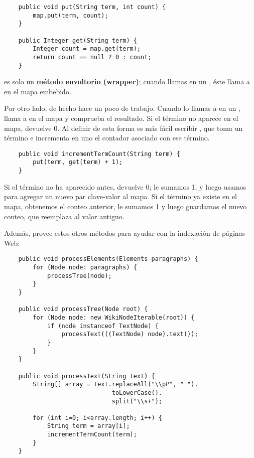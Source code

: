 \documentclass[12pt]{book}
\theoremstyle{exercise}
\begin{document}
\begin{verbatim}
    public void put(String term, int count) {
        map.put(term, count);
    }

    public Integer get(String term) {
        Integer count = map.get(term);
        return count == null ? 0 : count;
    }
\end{verbatim}

 es solo un \textbf{método envoltorio (wrapper)}; cuando llamas
 en un , éste llama a  en el
mapa embebido.


Por otro lado,  de hecho hace un poco de trabajo. Cuando lo
llamas a  en un , llama a  en el
mapa y comprueba el resultado. Si el término no aparece en el
mapa, devuelve 0. Al definir  de esta forma
es más fácil escribir , que toma un término e
incrementa en uno el contador asociado con ese término.

\begin{verbatim}
    public void incrementTermCount(String term) {
        put(term, get(term) + 1);
    }
\end{verbatim}

Si el término no ha aparecido antes,  devuelve 0; le sumamos 1,
y luego usamos  para agregar un nuevo par clave-valor al mapa.
Si el término ya existe en el mapa, obtenemos el conteo anterior, le sumamos
1 y luego guardamos el nuevo conteo, que reemplaza al valor antiguo.

Además,  provee estos otros métodos para ayudar con
la indexación de páginas Web:

\begin{verbatim}
    public void processElements(Elements paragraphs) {
        for (Node node: paragraphs) {
            processTree(node);
        }
    }

    public void processTree(Node root) {
        for (Node node: new WikiNodeIterable(root)) {
            if (node instanceof TextNode) {
                processText(((TextNode) node).text());
            }
        }
    }

    public void processText(String text) {
        String[] array = text.replaceAll("\\pP", " ").
                              toLowerCase().
                              split("\\s+");

        for (int i=0; i<array.length; i++) {
            String term = array[i];
            incrementTermCount(term);
        }
    }
\end{verbatim}
\end{document}
